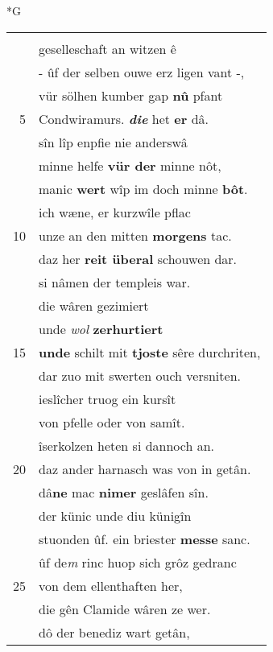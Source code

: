 \documentclass[8pt,a4paper,notitlepage]{article}
\begin{document}
\newpage
\begin{table}[ht]
\begin{minipage}[t]{0.5\linewidth}
\small
\begin{center}*G
\end{center}
\begin{tabular}{rl}
 & \textbf{\begin{large}G\end{large}ezucte} im \textbf{ie} bluot unde snê\\ 
 & geselleschaft an witzen ê\\ 
 & - ûf der selben ouwe erz ligen vant -,\\ 
 & vür sölhen kumber gap \textbf{nû} pfant\\ 
5 & Condwiramurs. \textit{\textbf{die}} het \textbf{er} dâ.\\ 
 & sîn lîp enpfie nie anderswâ\\ 
 & minne helfe \textbf{vür der} minne nôt,\\ 
 & manic \textbf{wert} wîp im doch minne \textbf{bôt}.\\ 
 & ich wæne, er kurzwîle pflac\\ 
10 & unze an den mitten \textbf{morgens} tac.\\ 
 & daz her \textbf{reit überal} schouwen dar.\\ 
 & si nâmen der templeis war.\\ 
 & die wâren gezimiert\\ 
 & unde \textit{wol} \textbf{zerhurtiert}\\ 
15 & \textbf{unde} schilt mit \textbf{tjoste} sêre durchriten,\\ 
 & dar zuo mit swerten ouch versniten.\\ 
 & ieslîcher truog ein kursît\\ 
 & von pfelle oder von samît.\\ 
 & îserkolzen heten si dannoch an.\\ 
20 & daz ander harnasch was von in getân.\\ 
 & dâ\textbf{ne} mac \textbf{nimer} geslâfen sîn.\\ 
 & der künic unde diu künigîn\\ 
 & stuonden ûf. ein briester \textbf{messe} sanc.\\ 
 & ûf de\textit{m} rinc huop sich grôz gedranc\\ 
25 & von dem ellenthaften her,\\ 
 & die gên Clamide wâren ze wer.\\ 
 & dô der benediz wart getân,\\ 

\end{tabular}
\end{minipage}
\end{table}
\end{document}
